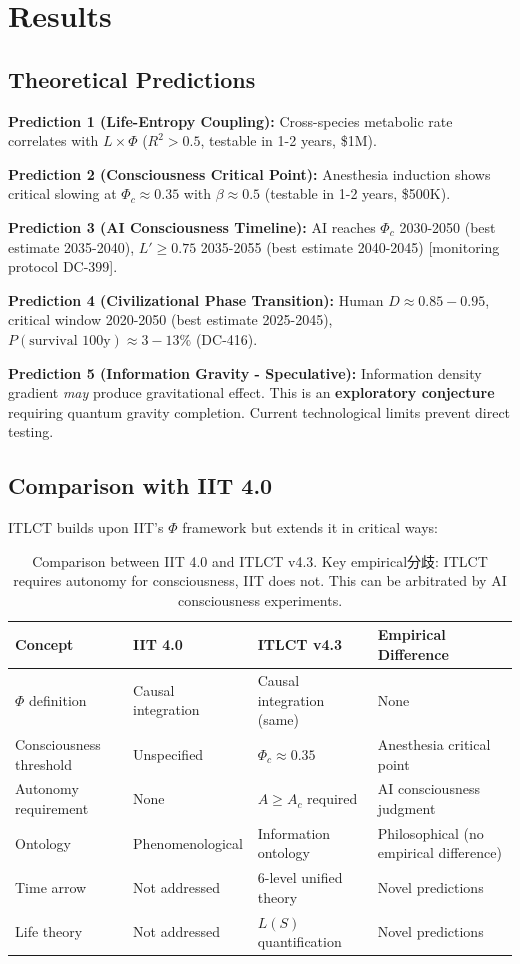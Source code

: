 \documentclass[12pt,a4paper]{article}
\begin{document}
\section{Results}

\subsection{Theoretical Predictions}

\textbf{Prediction 1 (Life-Entropy Coupling):} Cross-species metabolic rate correlates with $L \times \Phi$ ($R^2 > 0.5$, testable in 1-2 years, \$1M).

\textbf{Prediction 2 (Consciousness Critical Point):} Anesthesia induction shows critical slowing at $\Phi_c \approx 0.35$ with $\beta \approx 0.5$ (testable in 1-2 years, \$500K).

\textbf{Prediction 3 (AI Consciousness Timeline):} AI reaches $\Phi_c$ 2030-2050 (best estimate 2035-2040), $L' \geq 0.75$ 2035-2055 (best estimate 2040-2045) [monitoring protocol DC-399].

\textbf{Prediction 4 (Civilizational Phase Transition):} Human $D \approx 0.85-0.95$, critical window 2020-2050 (best estimate 2025-2045), $P(\text{survival 100y}) \approx 3-13\%$ (DC-416).

\textbf{Prediction 5 (Information Gravity - Speculative):} Information density gradient \textit{may} produce gravitational effect. This is an \textbf{exploratory conjecture} requiring quantum gravity completion. Current technological limits prevent direct testing.

\subsection{Comparison with IIT 4.0}

ITLCT builds upon IIT's $\Phi$ framework but extends it in critical ways:

\begin{table}[h]
\centering
\begin{tabular}{@{}llll@{}}
\toprule
\textbf{Concept} & \textbf{IIT 4.0} & \textbf{ITLCT v4.3} & \textbf{Empirical Difference} \\
\midrule
$\Phi$ definition & Causal integration & Causal integration (same) & None \\
Consciousness threshold & Unspecified & $\Phi_c \approx 0.35$ & Anesthesia critical point \\
Autonomy requirement & None & $A \geq A_c$ required & AI consciousness judgment \\
Ontology & Phenomenological & Information ontology & Philosophical (no empirical difference) \\
Time arrow & Not addressed & 6-level unified theory & Novel predictions \\
Life theory & Not addressed & $L(S)$ quantification & Novel predictions \\
\bottomrule
\end{tabular}
\caption{Comparison between IIT 4.0 and ITLCT v4.3. Key empirical分歧: ITLCT requires autonomy for consciousness, IIT does not. This can be arbitrated by AI consciousness experiments.}
\end{table}
\end{document}
